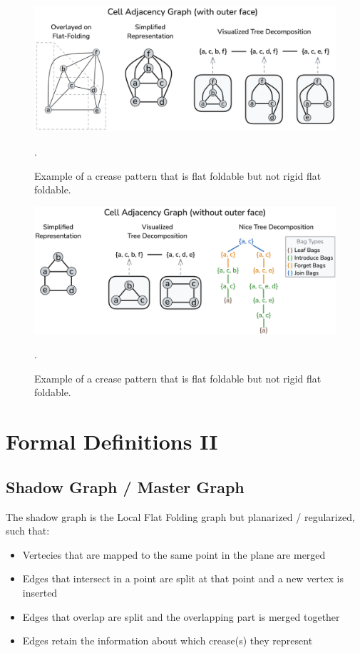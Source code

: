 \begin{figure}[h]
\centering
\includegraphics[width=\textwidth]{assets/demo_celladjacency_with_outer.png}
\caption{Example of a crease pattern that is flat foldable but not rigid flat foldable.}.
\label{fig:demo_celladjacency_with_outer}
\end{figure}

\begin{figure}[h]
\centering
\includegraphics[width=\textwidth]{assets/demo_celladjacency_without_outer.png}
\caption{Example of a crease pattern that is flat foldable but not rigid flat foldable.}.
\label{fig:demo_celladjacency_without_outer}
\end{figure}

\chapter{Formal Definitions II}
\section{Shadow Graph / Master Graph}

The shadow graph is the Local Flat Folding graph but planarized / regularized, such that:

\begin{itemize}
    \item Vertecies that are mapped to the same point in the plane are merged
    \item Edges that intersect in a point are split at that point and a new vertex is inserted
    \item Edges that overlap are split and the overlapping part is merged together
    \item Edges retain the information about which crease(s) they represent
\end{itemize}

